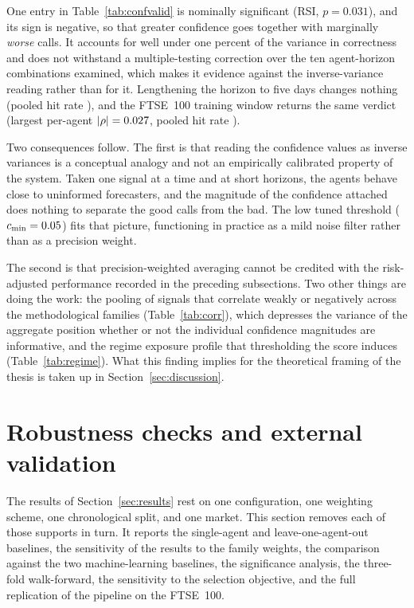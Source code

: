 One entry in Table~\ref{tab:confvalid} is nominally significant (RSI, $p = 0.031$), and its sign is negative, so that greater confidence goes together with marginally \emph{worse} calls. It accounts for well under one percent of the variance in correctness and does not withstand a multiple-testing correction over the ten agent-horizon combinations examined, which makes it evidence against the inverse-variance reading rather than for it. Lengthening the horizon to five days changes nothing (pooled hit rate \ConfPooledHitFive{}), and the FTSE~100 training window returns the same verdict (largest per-agent $|\rho| = 0.027{}$, pooled hit rate \FtseConfPooledHit{}).

Two consequences follow. The first is that reading the confidence values as inverse variances is a conceptual analogy and not an empirically calibrated property of the system. Taken one signal at a time and at short horizons, the agents behave close to uninformed forecasters, and the magnitude of the confidence attached does nothing to separate the good calls from the bad. The low tuned threshold ($c_{\min} = 0.05{}$) fits that picture, functioning in practice as a mild noise filter rather than as a precision weight.

The second is that precision-weighted averaging cannot be credited with the risk-adjusted performance recorded in the preceding subsections. Two other things are doing the work: the pooling of signals that correlate weakly or negatively across the methodological families (Table~\ref{tab:corr}), which depresses the variance of the aggregate position whether or not the individual confidence magnitudes are informative, and the regime exposure profile that thresholding the score induces (Table~\ref{tab:regime}). What this finding implies for the theoretical framing of the thesis is taken up in Section~\ref{sec:discussion}.

\section{Robustness checks and external validation}\label{sec:robustness}

The results of Section~\ref{sec:results} rest on one configuration, one weighting scheme, one chronological split, and one market. This section removes each of those supports in turn. It reports the single-agent and leave-one-agent-out baselines, the sensitivity of the results to the family weights, the comparison against the two machine-learning baselines, the significance analysis, the three-fold walk-forward, the sensitivity to the selection objective, and the full replication of the pipeline on the FTSE~100.


